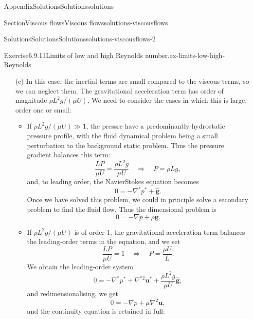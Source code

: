\documentclass[oneside,10pt,]{book}
\newcommand{\ptxlistdisc}{\raisebox{0.3ex}{\textbullet}}
\numberwithin{equation}{section}
\newcommand{\DD}[2]{\frac{\mathrm{D}#1}{\mathrm{D}#2}}
\newcommand{\bu}{\boldsymbol{u}}
\newcommand{\bg}{\boldsymbol{g}}
\begin{document}
\begin{appendixptx}{Appendix}{Solutions}{}{Solutions}{}{}{solutions}
\begin{sectionptx}{Section}{Viscous flows}{}{Viscous flows}{}{}{solutions-viscousflows}
\begin{solutions-subsection-numberless}{Solutions}{Solutions}{}{Solutions}{}{}{solutions-viscousflows-2}
\begin{divisionsolution}{Exercise}{6.9.11}{Limits of low and high Reynolds number.}{ex-limits-low-high-Reynolds}
\begin{enumerate}[font=\bfseries,label=(\alph*),ref=\alph*]
Multiplying the Navier\textendash{}Stokes equation by \(L^2/(\mu U)\), we get%
\begin{equation*}
\mathrm{Re}\DD{\bu^*}{t^*}
=-\frac{LP}{\mu U}\nabla^* p^*+\nabla^{*2}\bu^*+\frac{\rho L^2g}{\mu U}\hat{\bg}.
\end{equation*}
The coefficient multiplying the inertial terms is the Reynolds number \(\mathrm{Re}\).%
\item[(c)]\noindent\hypertarget{ex-limits-low-high-Reynolds-5-2-main}{}In this case, the inertial terms are small compared to the viscous terms, so we can neglect them. The gravitational acceleration term has order of magnitude \(\rho L^2g/(\mu U)\). We need to consider the cases in which this is large, order one or small:%
\begin{itemize}[label=\ptxlistdisc]
\item{}If \(\rho L^2g/(\mu U)\gg1\), the pressre have a predominantly hydrostatic pressure profile, with the fluid dynamical problem being a small perturbation to the background static problem. Thus the pressure gradient balances this term:%
\begin{equation*}
\frac{LP}{\mu U}=\frac{\rho L^2g}{\mu U}
\quad\Rightarrow\quad
P=\rho Lg,
\end{equation*}
and, to leading order, the Navier\textendash{}Stokes equation becomes%
\begin{equation*}
0=-\nabla^* p^*+\hat{\bg}.
\end{equation*}
Once we have solved this problem, we could in principle solve a secondary problem to find the fluid flow. Thus the dimensional problem is%
\begin{equation*}
0=-\nabla p+\rho\bg.
\end{equation*}
%
\item{}If \(\rho L^2g/(\mu U)\) is of order 1, the gravitational acceleration term balances the leading-order terms in the equation, and we set%
\begin{equation*}
\frac{LP}{\mu U}=1\quad\Rightarrow\quad P=\frac{\mu U}{L}.
\end{equation*}
We obtain the leading-order system%
\begin{equation*}
0=-\nabla^* p^*+\nabla^{*2}\bu^*+\frac{\rho L^2g}{\mu U}\hat{\bg},
\end{equation*}
and redimensionalising, we get%
\begin{equation*}
0=-\nabla p+\mu\nabla^2\bu,
\end{equation*}
and the continuity equation is retained in full:%
\begin{equation*}

\end{equation*}
\end{itemize}
\end{enumerate}
\end{divisionsolution}
\end{solutions-subsection-numberless}
\end{sectionptx}
\end{appendixptx}
\end{document}
